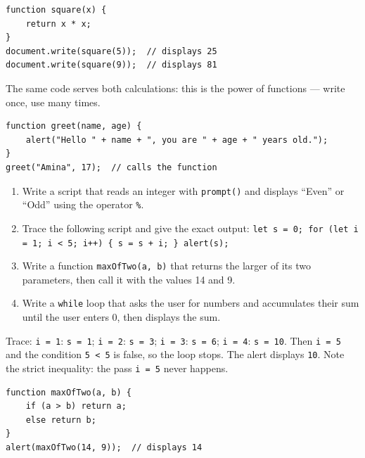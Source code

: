 \documentclass[11pt]{article}
\begin{document}
\begin{exemplebox}
\begin{verbatim}
function square(x) {
    return x * x;
}
document.write(square(5));  // displays 25
document.write(square(9));  // displays 81
\end{verbatim}
The same code serves both calculations: this is the power of functions --- write once, use many times.
\end{exemplebox}

\begin{exemplebox}
\begin{verbatim}
function greet(name, age) {
    alert("Hello " + name + ", you are " + age + " years old.");
}
greet("Amina", 17);  // calls the function
\end{verbatim}
\end{exemplebox}

\begin{exercice}[Practice]
\begin{enumerate}
\item Write a script that reads an integer with \texttt{prompt()} and displays ``Even'' or ``Odd'' using the operator \texttt{\%}.
\item Trace the following script and give the exact output: \texttt{let s = 0; for (let i = 1; i < 5; i++) \{ s = s + i; \} alert(s);}
\item Write a function \texttt{maxOfTwo(a, b)} that returns the larger of its two parameters, then call it with the values 14 and 9.
\item Write a \texttt{while} loop that asks the user for numbers and accumulates their sum until the user enters 0, then displays the sum.
\end{enumerate}
\end{exercice}

\begin{corrige}[Exercise n°2]
Trace: \texttt{i = 1}: \texttt{s = 1}; \texttt{i = 2}: \texttt{s = 3}; \texttt{i = 3}: \texttt{s = 6}; \texttt{i = 4}: \texttt{s = 10}. Then \texttt{i = 5} and the condition \texttt{5 < 5} is false, so the loop stops. The alert displays \texttt{10}. Note the strict inequality: the pass \texttt{i = 5} never happens.
\end{corrige}

\begin{corrige}[Exercise n°3]
\begin{verbatim}
function maxOfTwo(a, b) {
    if (a > b) return a;
    else return b;
}
alert(maxOfTwo(14, 9));  // displays 14
\end{verbatim}
\end{corrige}
\end{document}

